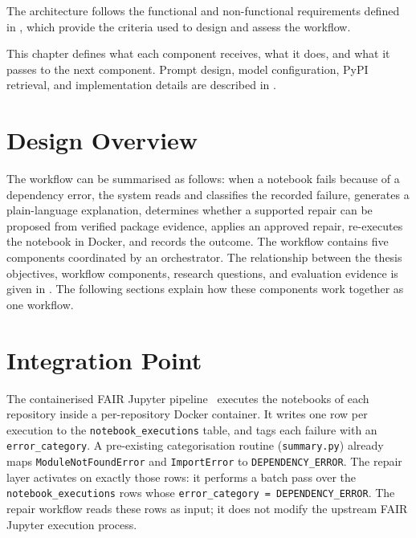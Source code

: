 The architecture follows the functional and non-functional requirements
defined in , which provide the criteria used to
design and assess the workflow.

This chapter defines what each component receives, what it does, and what it
passes to the next component. Prompt design, model configuration, PyPI
retrieval, and implementation details are described in
.

\section{Design Overview}
\label{sec:design-overview}

The workflow can be summarised as follows: when a notebook fails because of
a dependency error, the system reads and classifies the recorded failure,
generates a plain-language explanation, determines whether a supported repair
can be proposed from verified package evidence, applies an approved repair,
re-executes the notebook in Docker, and records the outcome. The workflow
contains five components coordinated by an orchestrator. The relationship
between the thesis objectives, workflow components, research questions, and
evaluation evidence is given in . The following
sections explain how these components work together as one workflow.

\section{Integration Point}
\label{sec:integration-point}

\begin{sloppypar}
The containerised FAIR Jupyter pipeline~\cite{samuel2025docker}
executes the notebooks of each repository inside a per-repository
Docker container. It writes one row per execution to the
\texttt{notebook\_executions} table, and tags each failure with an
\texttt{error\_category}. A pre-existing categorisation routine
(\texttt{summary.py}) already maps \texttt{ModuleNotFoundError} and
\texttt{ImportError} to \texttt{DEPENDENCY\_ERROR}. The repair layer
activates on exactly those rows: it performs a batch pass over the
\texttt{notebook\_executions} rows whose \texttt{error\_category =
DEPENDENCY\_ERROR}. The repair workflow reads these rows as input; it does
not modify the upstream FAIR Jupyter execution process.
\end{sloppypar}

